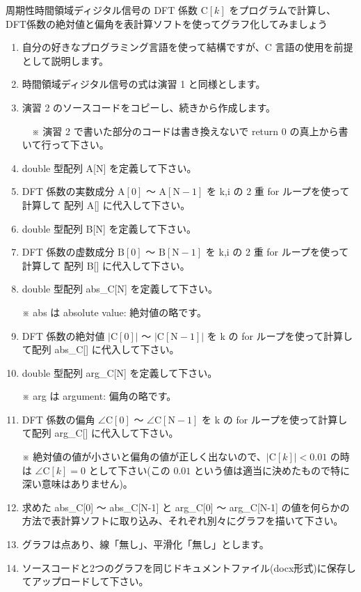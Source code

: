 \documentclass[a4paper]{jarticle}
\begin{document}
 周期性時間領域ディジタル信号の DFT 係数 $\textrm{C}[k]$ をプログラムで計算し、DFT係数の絶対値と偏角を表計算ソフトを使ってグラフ化してみましょう  \par
\par\vspace{1zh}
\begin{enumerate}
\item 自分の好きなプログラミング言語を使って結構ですが、C 言語の使用を前提として説明します。
\item 時間領域ディジタル信号の式は演習 1 と同様とします。
\item 演習 2 のソースコードをコピーし、続きから作成します。\par
　※ 演習 2 で書いた部分のコードは書き換えないで return 0 の真上から書いて行って下さい。
\item double 型配列 A[N] を定義して下さい。
\item DFT 係数の実数成分 $\textrm{A}[0]$ 〜 $\textrm{A}[\textrm{N}-1]$ を k,i の 2 重 for ループを使って計算して 配列 A[] に代入して下さい。
\item double 型配列 B[N] を定義して下さい。
\item DFT 係数の虚数成分 $\textrm{B}[0]$ 〜 $\textrm{B}[\textrm{N}-1]$ を k,i の 2 重 for ループを使って計算して 配列 B[] に代入して下さい。
\item double 型配列 abs\_C[N] を定義して下さい。\par
 ※ abs は absolute value: 絶対値の略です。
\item DFT 係数の絶対値 $|\textrm{C}[0]|$ 〜 $|\textrm{C}[\textrm{N}-1]|$ を k の for ループを使って計算して配列 abs\_C[] に代入して下さい。
\item double 型配列 arg\_C[N] を定義して下さい。\par
 ※ arg は argument: 偏角の略です。
\item DFT 係数の偏角 $\angle\textrm{C}[0]$ 〜 $\angle\textrm{C}[\textrm{N}-1]$ を k の for ループを使って計算して配列 arg\_C[]  に代入して下さい。\par
 ※  絶対値の値が小さいと偏角の値が正しく出ないので、$|\textrm{C}[k]| < 0.01$ の時は $\angle\textrm{C}[k] = 0$ として下さい(この $0.01$ という値は適当に決めたもので特に深い意味はありません)。\par
\item 求めた abs\_C[0] 〜  abs\_C[N-1] と arg\_C[0] 〜 arg\_C[N-1] の値を何らかの方法で表計算ソフトに取り込み、それぞれ別々にグラフを描いて下さい。
\item グラフは点あり、線「無し」、平滑化「無し」とします。
\item ソースコードと2つのグラフを同じドキュメントファイル(docx形式)に保存してアップロードして下さい。
\end{enumerate}
\end{document}
